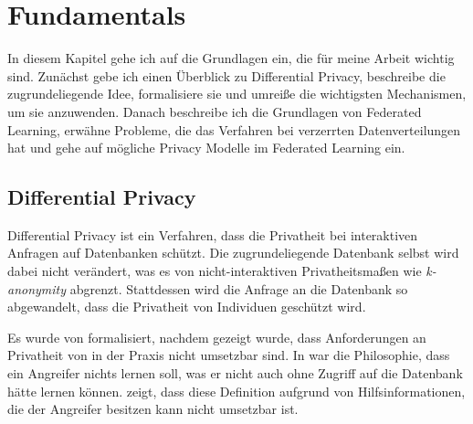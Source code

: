 \chapter{Fundamentals}\label{chap:fundamentals}


In diesem Kapitel gehe ich auf die Grundlagen ein, die für meine Arbeit wichtig sind. Zunächst gebe ich einen Überblick zu Differential Privacy, beschreibe die zugrundeliegende Idee, formalisiere sie und umreiße die wichtigsten Mechanismen, um sie anzuwenden. Danach beschreibe ich die Grundlagen von Federated Learning, erwähne Probleme, die das Verfahren bei verzerrten Datenverteilungen hat und gehe auf mögliche Privacy Modelle im Federated Learning ein.

\section{Differential Privacy}


Differential Privacy ist ein Verfahren, dass die Privatheit bei interaktiven Anfragen auf Datenbanken schützt. Die zugrundeliegende Datenbank selbst wird dabei nicht verändert, was es von nicht-interaktiven Privatheitsmaßen wie \textit{k-anonymity} abgrenzt. Stattdessen wird die Anfrage an die Datenbank so abgewandelt, dass die Privatheit von Individuen geschützt wird. 

Es wurde von \textcite{dwork:2006} formalisiert, nachdem gezeigt wurde, dass Anforderungen an Privatheit von \textcite{dalenius:1977} in der Praxis nicht umsetzbar sind. In \citeauthor{dalenius:1977} war die Philosophie, dass ein Angreifer nichts lernen soll, was er nicht auch ohne Zugriff auf die Datenbank hätte lernen können. \citeauthor{dwork:2006} zeigt, dass diese Definition aufgrund von Hilfsinformationen, die der Angreifer besitzen kann nicht umsetzbar ist. 

